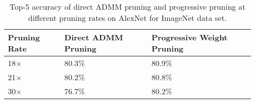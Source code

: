 \documentclass{article} %
\begin{document}
\begin{table*}[h]
\centering
\caption{Top-5 accuracy of direct ADMM pruning \citep{zhang2018systematic} and progressive pruning at different pruning rates on AlexNet for ImageNet data set.}\label{table:AlexNet_2}
\begin{tabular}{p{2cm}p{4cm}p{4cm}}
\hline
\hline
Pruning Rate & Direct ADMM Pruning & Progressive Weight Pruning\\ \hline
18$\times$  & 80.3\% &  80.9\%\\ \hline
21$\times$  & 80.2\% &  80.8\%\\ \hline
30$\times$  & 76.7\% &  80.2\%\\ \hline \hline
\end{tabular}
\end{table*}
\end{document}
